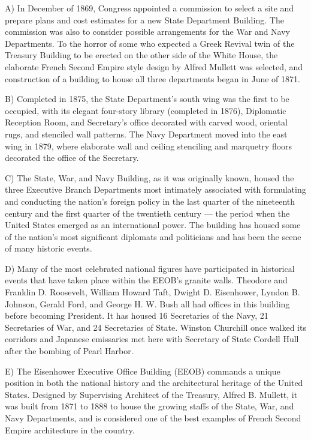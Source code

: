 \documentclass[UTF8,11pt]{ctexart}
\begin{document}
A) In December of 1869, Congress appointed a commission to select a site and prepare plans and cost estimates for a new State Department Building. The commission was also to consider possible arrangements for the War and Navy Departments. To the horror of some who expected a Greek Revival twin of the Treasury Building to be erected on the other side of the White House, the elaborate French Second Empire style design by Alfred Mullett was selected, and construction of a building to house all three departments began in June of 1871.


B) Completed in 1875, the State Department’s south wing was the first to be occupied, with its elegant four-story library (completed in 1876), Diplomatic Reception Room, and Secretary’s office decorated with carved wood, oriental rugs, and stenciled wall patterns. The Navy Department moved into the east wing in 1879, where elaborate wall and ceiling stenciling and marquetry floors decorated the office of the Secretary.


C) The State, War, and Navy Building, as it was originally known, housed the three Executive Branch Departments most intimately associated with formulating and conducting the nation’s foreign policy in the last quarter of the nineteenth century and the first quarter of the twentieth century — the period when the United States emerged as an international power. The building has housed some of the nation’s most significant diplomats and politicians and has been the scene of many historic events.


D) Many of the most celebrated national figures have participated in historical events that have taken place within the EEOB’s granite walls. Theodore and Franklin D. Roosevelt, William Howard Taft, Dwight D. Eisenhower, Lyndon B. Johnson, Gerald Ford, and George H. W. Bush all had offices in this building before becoming President. It has housed 16 Secretaries of the Navy, 21 Secretaries of War, and 24 Secretaries of State. Winston Churchill once walked its corridors and Japanese emissaries met here with Secretary of State Cordell Hull after the bombing of Pearl Harbor.


E) The Eisenhower Executive Office Building (EEOB) commands a unique position in both the national history and the architectural heritage of the United States. Designed by Supervising Architect of the Treasury, Alfred B. Mullett, it was built from 1871 to 1888 to house the growing staffs of the State, War, and Navy Departments, and is considered one of the best examples of French Second Empire architecture in the country.
\end{document}
